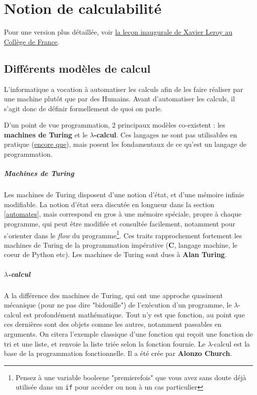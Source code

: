 
\chapter{Notion de calculabilité}

Pour une version plus détaillée, voir \href{https://www.college-de-france.fr/site/xavier-leroy/inaugural-lecture-2018-11-15-18h00.htm}{la leçon inaugurale de Xavier Leroy au Collège de France}.

\section{Différents modèles de calcul}

L'informatique a vocation à automatiser les calculs afin de les faire réaliser par une machine plutôt que par des Humains. Avant d'automatiser les calculs, il s'agit donc de définir formellement de quoi on parle.

D'un point de vue programmation, 2 principaux modèles co-existent : les \textbf{machines de Turing} et le \textbf{$\lambda$-calcul}. Ces langages ne sont pas utilisables en pratique (\href{http://www.ens-lyon.fr/actualite/lecole/la-machine-de-turing-en-legos}{encore que}), mais posent les fondamentaux de ce qu'est un langage de programmation.

\paragraph{Machines de Turing} Les machines de Turing disposent d'une notion d'état, et d'une mémoire infinie modifiable. La notion d'état sera discutée en longueur dans la section \ref{automates}, mais correspond en gros à une mémoire spéciale, propre à chaque programme, qui peut être modifiée et consultée facilement, notamment pour s'orienter dans le \textit{flow} du programme\footnote{Pensez à une variable booleene "premierefois" que vous avez sans doute déjà utilisée dans un \texttt{if} pour accéder ou non à un cas particulier}. Ces traits rapprochement fortement les machines de Turing de la programmation impérative (\textbf{C}, langage machine, le coeur de Python etc). Les machines de Turing sont dues à \textbf{Alan Turing}.

\paragraph{$\lambda$-calcul} A la différence des machines de Turing, qui ont une approche quasiment mécanique (pour ne pas dire "bidouille") de l'exécution d'un programme, le $\lambda$-calcul est profondément mathématique. Tout n'y est que fonction, au point que ces dernières sont des objets comme les autres, notamment passables en arguments. On citera l'exemple classique d'une fonction qui reçoit une fonction de tri et une liste, et renvoie la liste triée selon la fonction fournie. Le $\lambda$-calcul est la base de la programmation fonctionnelle. Il a été crée par \textbf{Alonzo Church}.


